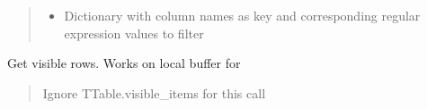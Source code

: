 \documentclass[letterpaper,10pt,english]{sphinxmanual}
\begin{document}
\begin{savenotes}
\begin{fulllineitems}
\begin{savenotes}
\begin{fulllineitems}
\begin{quote}
\begin{description}
\begin{itemize}
\item {} 
\sphinxAtStartPar
{} \textendash{} Dictionary with column names as key and corresponding regular expression values to filter

\end{itemize}

\end{description}\end{quote}

\end{fulllineitems}\end{savenotes}


\begin{savenotes}\begin{fulllineitems}
\label{\detokenize{eezz:eezz.database.TDatabaseTable.get_visible_rows}}
\pysigstartsignatures
{}
\pysigstopsignatures
\sphinxAtStartPar
Get visible rows. Works on local buffer for 
\begin{quote}\begin{description}
\sphinxAtStartPar
{} \textendash{} Ignore TTable.visible\_items for this call

\end{description}\end{quote}

\end{fulllineitems}\end{savenotes}



\end{fulllineitems}
\end{savenotes}
\end{document}

